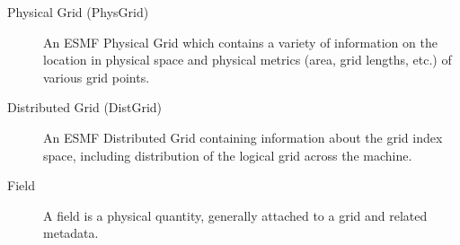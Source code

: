 
\begin{description}

\item [Physical Grid (PhysGrid)] \label{term:physgrid} 
      An ESMF Physical Grid which contains a variety of information
      on the location in physical space and physical metrics (area,
      grid lengths, etc.) of various grid points.

\item [Distributed Grid (DistGrid)] \label{term:distgrid}
      An ESMF Distributed Grid containing information about the
      grid index space, including distribution of the logical
      grid across the machine.

\item [Field] \label{term:field}
      A field is a physical quantity, generally attached to
      a grid and related metadata.

\end{description}

